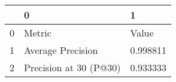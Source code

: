 \begin{tabular}{lll}
\toprule
{} &                       0 &         1 \\
\midrule
0 &                  Metric &     Value \\
1 &       Average Precision &  0.998811 \\
2 &  Precision at 30 (P@30) &  0.933333 \\
\bottomrule
\end{tabular}
